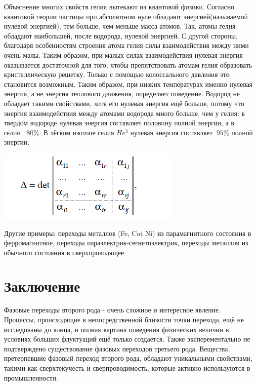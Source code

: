 \documentclass[a4paper,12pt]{article}
\begin{document}
Объяснение многих свойств гелия вытекают из квантовой физики. Согласно квантовой теории частицы при абсолютном нуле обладают энергией(называемой нулевой энергией), тем больше, чем меньше масса атомов. Так, атомы гелия обладают наибольшей, после водорода, нулевой энергией. С другой стороны, благодаря особенностям строения атома гелия силы взаимодействия между ними очень малы.  Таким образом, при малых силах взаимодействия нулевая энергия оказывается достаточной для того, чтобы препятствовать атомам гелия образовать кристаллическую решетку. Только с помощью колоссального давления это становится возможным.
Таким образом, при низких температурах именно нулевая энергия, а не энергия теплового движения, определяет поведение.
Водород не обладает такими свойствами, хотя его нулевая энергия ещё больше, потому что энергия взаимодействия между атомами водорода много больше, чем у гелия: в твердом водороде нулевая энергия составляет половину полной энергии, а в гелии ~80$\%$. В лёгком изотопе гелия $He^{3}$ нулевая энергия составляет $~95\%$ полной энергии.

\includegraphics[scale=0.5]{pic1.png}

Другие примеры: переходы металлов (Fe, Cot Ni) из парамагнитного
состояния в ферромагнитное, переходы параэлектрик-сегнетоэлектрик, переходы металлов из обычного состояния в сверхпроводящее.

\newpage
\section{Заключение}
Фазовые переходы второго рода - очень сложное и интересное явление. Процессы, происходящие в непосредственной близости точки перехода, ещё не исследованы до конца, и полная картина поведения физических величин в условиях больших флуктуаций ещё только создается. Также эксперементально не подтверждено существование фазовых переходов третьего рода. Вещества, претерпевшие фазовый переход второго рода, обладают уникальными свойствами, такими как сверхтекучесть и сверпроводимость, которые активно используются в промышленности.


 
 
\end{document}
